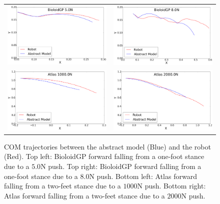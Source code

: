 \begin{figure}[ht]
\center
\setlength{\tabcolsep}{1pt}
\renewcommand{\arraystretch}{0.5}
\begin{tabular}{c c}
\includegraphics[width=2.2in]{images/COM_GP_A.png}&
\includegraphics[width=2.2in]{images/COM_GP_B.png}\\
\includegraphics[width=2.2in]{images/COM_Atlas_A.png}&
\includegraphics[width=2.2in]{images/COM_Atlas_B.png}\\
\end{tabular}

  \caption{COM trajectories between the abstract model
      (Blue) and the robot (Red). 
      Top left: BioloidGP forward falling from a one-foot stance due to a
      $5.0$N push. Top right: BioloidGP forward falling from a one-foot stance
      due to a $8.0$N push. Bottom left: Atlas forward falling from a two-feet
      stance due to a $1000$N push. Bottom right: Atlas forward falling 
      from a two-feet stance due to a $2000$N push.}
  \label{fig:falling_coms}
\end{figure}

